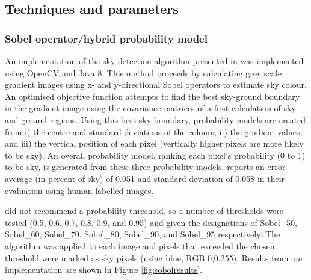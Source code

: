 \documentclass[final,3p,times,authoryear]{elsarticle}
\begin{document}
\subsection{Techniques and parameters}
\subsubsection{\cite{Wang2015a} Sobel operator/hybrid probability model}\label{sec:prob}
An implementation of the sky detection algorithm presented in \cite{Wang2015a} was implemented using OpenCV and Java 8. This method proceeds by calculating grey scale gradient images using x- and y-directional Sobel operators to estimate sky colour. An optimised objective function attempts to find the best sky-ground boundary in the gradient image using the covariance matrices of a first calculation of sky and ground regions. Using this best sky boundary, probability models are created from i) the centre and standard deviations of the colours, ii) the gradient values, and iii) the vertical position of each pixel (vertically higher pixels are more likely to be sky). An overall probability model, ranking each pixel's probability (0 to 1) to be sky, is generated from these three probability models. \cite{Wang2015a} reports an error average (in percent of sky) of 0.051 and standard deviation of 0.058 in their evaluation using human-labelled images.  

\cite{Wang2015a} did not recommend a probability threshold, so a number of thresholds were tested (0.5, 0.6, 0.7, 0.8, 0.9, and 0.95) and given the designations of Sobel\_50, Sobel\_60, Sobel\_70, Sobel\_80, Sobel\_90, and Sobel\_95 respectively. The algorithm was applied to each image and pixels that exceeded the chosen threshold were marked as sky pixels (using blue, RGB 0,0,255). Results from our implementation are shown in Figure \ref{fig:sobolresults}. 


\end{document}
